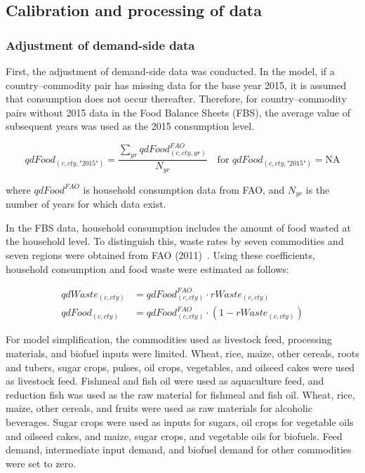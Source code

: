 \subsection{Calibration and processing of data}
\subsubsection{Adjustment of demand-side data}

First, the adjustment of demand-side data was conducted. 
In the model, if a country–commodity pair has missing data for the base year 2015, it is assumed that consumption does not occur thereafter. 
Therefore, for country–commodity pairs without 2015 data in the Food Balance Sheets (FBS), the average value of subsequent years was used as the 2015 consumption level.

\begin{equation}
qdFood_{(c,cty,\text{"2015"})} = \frac{\sum_{yr} qdFood^{FAO}_{(c,cty,yr)}}{N_{yr}}
\quad \text{for } qdFood_{(c,cty,\text{"2015"})} = \text{NA}
\end{equation}

where \( qdFood^{FAO} \) is household consumption data from FAO,
and \( N_{yr} \) is the number of years for which data exist.

In the FBS data, household consumption includes the amount of food wasted at the household level. 
To distinguish this, waste rates by seven commodities and seven regions were obtained from FAO (2011)~\cite{faoGlobalFoodLossesAndFoodWaste2011}. 
Using these coefficients, household consumption and food waste were estimated as follows:

\begin{align}
qdWaste_{(c,cty)} &= qdFood^{FAO}_{(c,cty)} \cdot rWaste_{(c,cty)} \\
qdFood_{(c,cty)} &= qdFood^{FAO}_{(c,cty)} \cdot (1 - rWaste_{(c,cty)})
\end{align}

For model simplification, the commodities used as livestock feed, processing materials, and biofuel inputs were limited. 
Wheat, rice, maize, other cereals, roots and tubers, sugar crops, pulses, oil crops, vegetables, and oilseed cakes were used as livestock feed. 
Fishmeal and fish oil were used as aquaculture feed, and reduction fish was used as the raw material for fishmeal and fish oil. 
Wheat, rice, maize, other cereals, and fruits were used as raw materials for alcoholic beverages. 
Sugar crops were used as inputs for sugars, oil crops for vegetable oils and oilseed cakes, and maize, sugar crops, and vegetable oils for biofuels. 
Feed demand, intermediate input demand, and biofuel demand for other commodities were set to zero.

